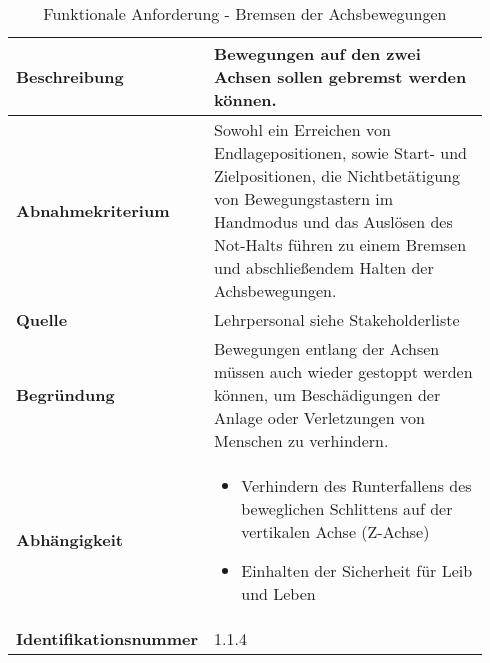 \documentclass[../Bachelorarbeit.tex]{subfiles}
\begin{document}
\begin{table}[H]
    \centering
    \begin{tabular}{| p{0.34\linewidth} | p{0.6\linewidth} |}
        \hline
        \textbf{Beschreibung} & Bewegungen auf den zwei Achsen sollen gebremst werden können. \\ \hline
        \textbf{Abnahmekriterium} & Sowohl ein Erreichen von Endlagepositionen, sowie Start- und Zielpositionen, die Nichtbetätigung von Bewegungstastern im Handmodus und das Auslösen des Not-Halts führen zu einem Bremsen und abschließendem Halten der Achsbewegungen. \\ \hline
        \textbf{Quelle} & Lehrpersonal siehe Stakeholderliste \\ \hline
        \textbf{Begründung} & Bewegungen entlang der Achsen müssen auch wieder gestoppt werden können, um Beschädigungen der Anlage oder Verletzungen von Menschen zu verhindern. \\ \hline
        \textbf{Abhängigkeit} & {\begin{itemize}[noitemsep,topsep=0pt,parsep=0pt,partopsep=0pt,leftmargin=*]
            \item Verhindern des Runterfallens des beweglichen Schlittens auf der vertikalen Achse (Z-Achse)
            \item Einhalten der Sicherheit für Leib und Leben
        \end{itemize}} \\ \hline
        \textbf{Identifikationsnummer} & 1.1.4 \\ \hline
    \end{tabular}
    \caption[\acs{fa} - Bremsen der Achsbewegungen]{Funktionale Anforderung - Bremsen der Achsbewegungen}
    \label{tab:my-table4}
\end{table}
\end{document}
